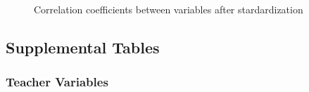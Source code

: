 \documentclass[
  number,
  preprint,
  3p,
  onecolumn]{elsarticle}
\begin{document}
\begin{figure}


\caption{\label{fig-corr}Correlation coefficients between variables
after stardardization}

\end{figure}%

\subsection{Supplemental Tables}\label{supplemental-tables}

\subsubsection{Teacher Variables}\label{teacher-variables}
\end{document}

